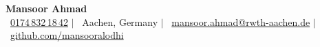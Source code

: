 \documentclass[letterpaper,11pt]{article}
\begin{document}

\begin{center}
    \textbf{\Huge \color{OliveGreen} Mansoor Ahmad} \\ \vspace{2ex}
    \small 
    \faPhone\ \href{tel:+49-174-832-18-42}{0174\,832\,18\,42} $|$
    \faMapMarker\ Aachen, Germany $|$
    \faEnvelope\ \href{mailto:malodhi97@gmail.com}{mansoor.ahmad@rwth-aachen.de} $|$
    \faGithub\ \href{https://github.com/mansooralodhi}{github.com/mansooralodhi}
\end{center}

\vspace{1pt}







\end{document}

